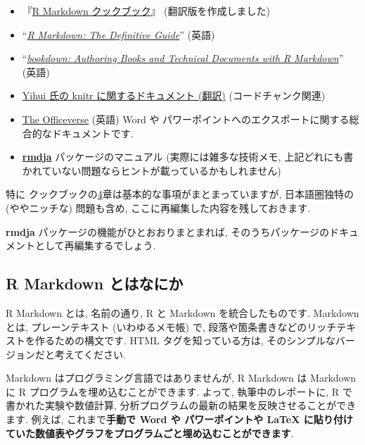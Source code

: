 \documentclass[
]{ltjsarticle}
\providecommand{\tightlist}{%
  \setlength{\itemsep}{0pt}\setlength{\parskip}{0pt}}
\begin{document}
\begin{itemize}
\tightlist
\item
  \citet{xie2020Markdowna}『\href{https://gedevan-aleksizde.github.io/rmarkdown-cookbook/}{R Markdown クックブック}』 (翻訳版を作成しました)
\item
  \citet{xie2019Markdown} ``\href{https://bookdown.org/yihui/rmarkdown/markdown-syntax.html}{\emph{R Markdown: The Definitive Guide}}'' (英語)
\item
  \citet{R-bookdown} ``\href{https://bookdown.org/yihui/bookdown/}{\emph{bookdown: Authoring Books and Technical Documents with R Markdown}}'' (英語)
\item
  \href{https://gedevan-aleksizde.github.io/knitr-doc-ja/index.html}{Yihui 氏の knitr に関するドキュメント (翻訳)} (コードチャンク関連)
\item
  \href{https://ardata-fr.github.io/officeverse/}{The Officeverse} (英語) Word や パワーポイントへのエクスポートに関する総合的なドキュメントです.
\item
  \href{https://github.com/Gedevan-Aleksizde/rmdja}{\textbf{rmdja}} パッケージのマニュアル (実際には雑多な技術メモ, 上記どれにも書かれていない問題ならヒントが載っているかもしれません)
\end{itemize}

特に クックブックの\href{https://gedevan-aleksizde.github.io/rmarkdown-cookbook/document-elements.html}{4}章は基本的な事項がまとまっていますが, 日本語圏独特の (ややニッチな) 問題も含め, ここに再編集した内容を残しておきます.

\textbf{rmdja} パッケージの機能がひとおおりまとまれば, そのうちパッケージのドキュメントとして再編集するでしょう.

\hypertarget{r-markdown-ux3068ux306fux306aux306bux304b}{%
\subsection*{R Markdown とはなにか}\label{r-markdown-ux3068ux306fux306aux306bux304b}}

R Markdown とは, 名前の通り, R と Markdown を統合したものです. Markdown とは, プレーンテキスト (いわゆるメモ帳) で, 段落や箇条書きなどのリッチテキストを作るための構文です. HTML タグを知っている方は, そのシンプルなバージョンだと考えてください.

Markdown はプログラミング言語ではありませんが, R Markdown は Markdown に R プログラムを埋め込むことができます. よって, 執筆中のレポートに, R で書かれた実験や数値計算, 分析プログラムの最新の結果を反映させることができます. 例えば, これまで\textbf{手動で Word や パワーポイントや LaTeX に貼り付けていた数値表やグラフをプログラムごと埋め込むことができます}.
\end{document}
